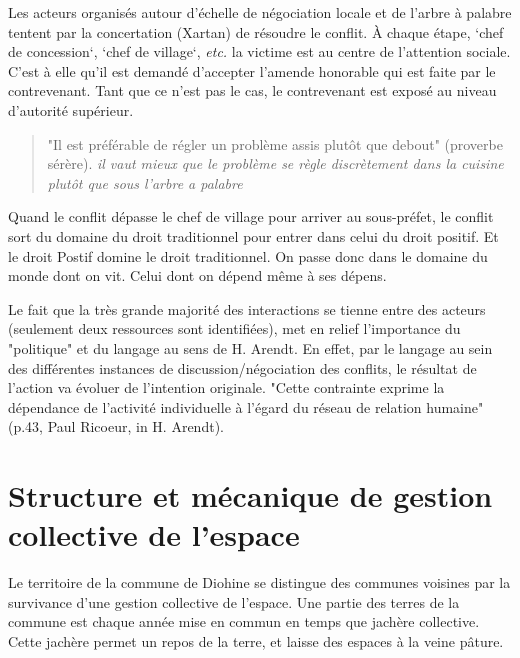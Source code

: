 Les acteurs organisés autour d’échelle de négociation locale et de l'arbre à palabre tentent par la concertation (Xartan) de résoudre le conflit. À chaque étape, `chef de concession`, `chef de village`, \textit{etc.} la victime est au centre de l'attention sociale. C'est à elle qu'il est demandé d'accepter l'amende honorable qui est faite par le contrevenant. Tant que ce n'est pas le cas, le contrevenant est exposé au niveau d'autorité supérieur.

\begin{quote}
    "Il est préférable de régler un problème assis plutôt que debout" (proverbe sérère). \textit{il vaut mieux que le problème se règle discrètement dans la cuisine plutôt que sous l'arbre a palabre}
\end{quote}


Quand le conflit dépasse le chef de village pour arriver au sous-préfet, le conflit sort du domaine du droit traditionnel pour entrer dans celui du droit positif. Et le droit Postif domine le droit traditionnel. On passe donc dans le domaine du monde dont on vit. Celui dont on dépend même à ses dépens.

Le fait que la très grande majorité des interactions se tienne  entre des  acteurs (seulement deux ressources sont identifiées), met en relief l'importance du "politique" et du langage au sens de H. Arendt\cite{arendt_condition_2020}. En effet, par le langage au sein des différentes instances de discussion/négociation des conflits, le résultat de l'action va évoluer de l'intention originale. "Cette contrainte exprime la dépendance de l'activité individuelle à l'égard du réseau de relation humaine" (p.43, Paul Ricoeur, in H. Arendt\cite{arendt_condition_2020}).

\section{Structure et mécanique de gestion collective de l'espace}

Le territoire de la commune de Diohine se distingue des communes voisines par la survivance d'une gestion collective de l'espace. Une partie des terres de la commune est chaque année mise en commun en temps que jachère collective. Cette jachère permet un repos de la terre, et laisse des espaces à la veine pâture.

